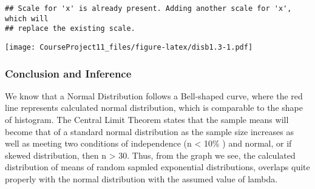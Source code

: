 \documentclass[
]{article}
\begin{document}
\begin{verbatim}
## Scale for 'x' is already present. Adding another scale for 'x', which will
## replace the existing scale.
\end{verbatim}

\texttt{[image: CourseProject11\_files/figure-latex/disb1.3-1.pdf]}

\hypertarget{conclusion-and-inference}{%
\subsubsection{Conclusion and
Inference}\label{conclusion-and-inference}}

We know that a Normal Distribution follows a Bell-shaped curve, where
the red line represents calculated normal distribution, which is
comparable to the shape of histogram. The Central Limit Theorem states
that the sample means will become that of a standard normal distribution
as the sample size increases as well as meeting two conditions of
independence (n \textless{} 10\% ) and normal, or if skewed
distribution, then n \textgreater{} 30. Thus, from the graph we see, the
calculated distribution of means of random sapmled exponential
distributions, overlaps quite properly with the normal distribution with
the assumed value of lambda.
\end{document}
